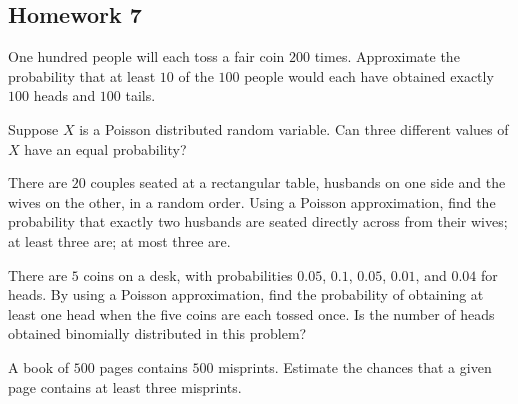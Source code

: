 \subsection{Homework 7}
\begin{problem}
  One hundred people will each toss a fair coin \(200\) times. Approximate
  the probability that at least \(10\) of the \(100\) people would each
  have obtained exactly \(100\) heads and \(100\) tails.
\end{problem}
\begin{solution*}
\end{solution*}

\begin{problem}
  Suppose \(X\) is a Poisson distributed random variable. Can three
  different values of \(X\) have an equal probability?
\end{problem}
\begin{solution*}

\end{solution*}

\begin{problem}
  There are \(20\) couples seated at a rectangular table, husbands on one
  side and the wives on the other, in a random order. Using a Poisson
  approximation, find the probability that exactly two husbands are seated
  directly across from their wives; at least three are; at most three are.
\end{problem}
\begin{solution*}

\end{solution*}

\begin{problem}
  There are \(5\) coins on a desk, with probabilities \(0.05\), \(0.1\),
  \(0.05\), \(0.01\), and \(0.04\) for heads. By using a Poisson
  approximation, find the probability of obtaining at least one head when
  the five coins are each tossed once. Is the number of heads obtained
  binomially distributed in this problem?
\end{problem}
\begin{solution*}

\end{solution*}

\begin{problem}[Handout 10, \# 8]
  A book of \(500\) pages contains \(500\) misprints. Estimate the chances
  that a given page contains at least three misprints.
\end{problem}
\begin{solution*}

\end{solution*}

